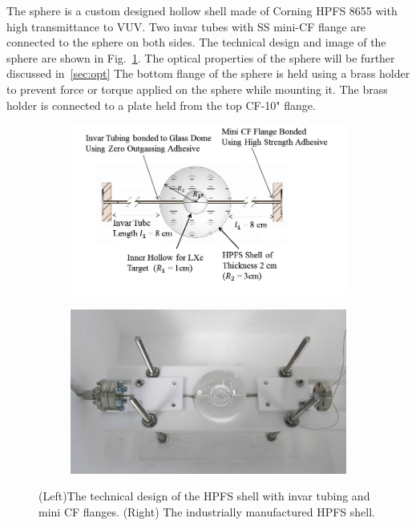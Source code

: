 The sphere is a custom designed hollow shell made of Corning HPFS 8655 with high transmittance to VUV. Two invar tubes with SS mini-CF flange are connected to the sphere on both sides. The technical design and image of the sphere are shown in Fig.~\ref{fig:sphere}. The optical properties of the sphere will be further discussed in~\ref{sec:opt} 
The bottom flange of the sphere is held using a brass holder to prevent 
force or torque applied on the sphere while mounting it. The 
brass holder is connected to a plate held from the top CF-10" flange. 


\begin{figure}[h]
\centering
\begin{subfigure}[c]{0.4\textheight}
\includegraphics[width=\textwidth]{spheredesign1.png}
\end{subfigure}
\begin{subfigure}[c]{0.25\textheight}
\includegraphics[width=\textwidth]{spherephoto.png}
\end{subfigure}
\caption{(Left)The technical design of the HPFS shell with invar tubing and mini CF flanges. 
(Right) The industrially manufactured HPFS shell.} 
\label{fig:sphere}
\end{figure}



